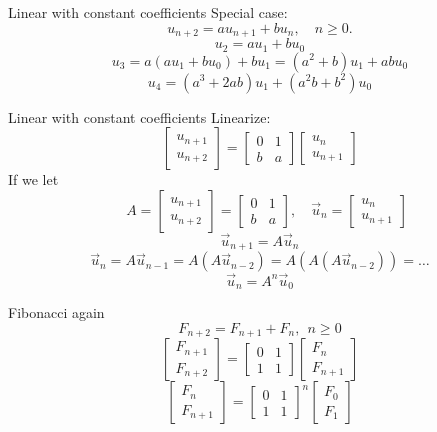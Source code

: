\documentclass{beamer}
\begin{document}
\begin{frame}{Linear with constant coefficients}
Special case:
$$u_{n+2} = au_{n+1} + bu_n,\quad n\geq 0.$$
\pause
$$u_2 = au_1 + bu_0$$
\pause
$$u_3 = a(au_1 + bu_0) + bu_1 = (a^2+b)u_1 + abu_0$$
\pause
$$u_4 = (a^3+2ab)u_1 + (a^2b + b^2)u_0$$
\end{frame}

\begin{frame}{Linear with constant coefficients}
Linearize:
$$\left[\begin{array}{c}u_{n+1}\\u_{n+2}\end{array}\right] = \left[\begin{array}{cc}
0 & 1\\
b & a
\end{array}\right] \left[\begin{array}{c}u_n\\u_{n+1}\end{array}\right]$$
\pause
If we let
$$\quad A = \left[\begin{array}{c}u_{n+1}\\u_{n+2}\end{array}\right] = \left[\begin{array}{cc}
0 & 1\\
b & a
\end{array}\right],\quad \vec u_n = \left[\begin{array}{c}u_n\\u_{n+1}\end{array}\right]$$
\pause
$$\vec u_{n+1} = A\vec u_n$$
\pause
$$\vec u_{n} = A\vec u_{n-1} = A(A\vec u_{n-2}) = A(A(A\vec u_{n-2})) = \dots$$
\pause
$$\vec u_n = A^n\vec u_0$$
\end{frame}

\begin{frame}{Fibonacci again}
$$F_{n+2} = F_{n+1} + F_{n},\ \ n\geq 0$$
\pause
$$\left[\begin{array}{c}F_{n+1}\\F_{n+2}\end{array}\right] = \left[\begin{array}{cc}
0 & 1\\
1 & 1
\end{array}\right] \left[\begin{array}{c}F_n\\F_{n+1}\end{array}\right]$$
\pause
$$\left[\begin{array}{c}F_n\\F_{n+1}\end{array}\right] = 
\left[\begin{array}{cc}
0 & 1\\
1 & 1
\end{array}\right]^n
\left[\begin{array}{c}F_0\\F_1\end{array}\right]
$$
\end{frame}
\end{document}
